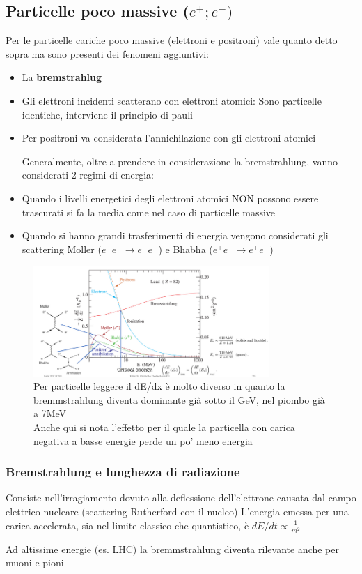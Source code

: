\subsection*{Particelle poco massive ($e^{+} ; e^{-})$}
Per le particelle cariche poco massive (elettroni e positroni) vale quanto detto sopra ma sono presenti dei fenomeni aggiuntivi: 
\begin{itemize}
    

    \item La \textbf{bremstrahlug}  
    \item Gli elettroni incidenti scatterano con elettroni atomici: Sono particelle identiche, interviene il principio di pauli
    \item Per positroni va considerata l'annichilazione con gli elettroni atomici

    Generalmente, oltre a prendere in considerazione la bremstrahlung, vanno considerati 2 regimi di energia:

    \item Quando i livelli energetici degli elettroni atomici NON possono essere trascurati si fa la media come nel caso di particelle massive
    \item Quando si hanno grandi trasferimenti di energia vengono considerati gli scattering Moller ($e^- e^- \to e^- e^-$) e Bhabha ($e^+ e^- \to e^+ e^-$)  
\end{itemize}

\begin{figure}[H]
    \centering
    \includegraphics[width=0.8\textwidth,frame]{Chapters/images/Interazione_radiazione_materia/image-20220217021527324.png}
    \captionsetup{width=0.8\linewidth}
    \caption{Per particelle leggere il dE/dx è molto diverso in quanto la bremmstrahlung diventa dominante già sotto il GeV, nel piombo già a 7MeV \\ Anche qui si nota l'effetto per il quale la particella con carica negativa a basse energie perde un po' meno energia}
    \label{fig:electronloss}
\end{figure}
\subsubsection*{Bremstrahlung e lunghezza di radiazione}
Consiste nell'irragiamento dovuto alla deflessione dell'elettrone causata dal campo elettrico nucleare (scattering Rutherford con il nucleo)
\newline
L'energia emessa per una carica accelerata, sia nel limite classico che quantistico, è $dE/dt \propto \frac{1}{m^2}$

\begin{note}
    Ad altissime energie (es. LHC) la bremmstrahlung diventa rilevante anche per muoni e pioni
\end{note}
